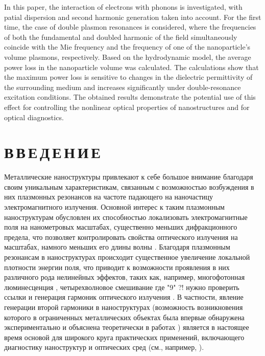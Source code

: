 \documentclass[12pt, a4paper]{article}
\newcommand{\rd}[1]{\color{red} #1 \color{black}}
\begin{document}
In this paper, the interaction of electrons with phonons is investigated, with  patial dispersion and second harmonic generation taken into account.
For the first time, the case of double plasmon resonances is considered, where the frequencies of both the fundamental and doubled harmonic of the field simultaneously coincide with the Mie frequency and the frequency of one of the nanoparticle's volume plasmons, respectively.
Based on the hydrodynamic model, the average power loss in the nanoparticle volume was calculated.
The calculations show that the maximum power loss is sensitive to changes in the dielectric permittivity of the surrounding medium and increases significantly under double-resonance excitation conditions.
The obtained results demonstrate the potential use of this effect for controlling the nonlinear optical properties of nanostructures and for optical diagnostics.\\



\newpage

\section*{В\,В\,Е\,Д\,Е\,Н\,И\,Е}

Металлические наноструктуры привлекают к себе большое внимание благодаря своим уникальным характеристикам, связанным с возможностью возбуждения в них плазмонных резонансов на частоте падающего на наночастицу электромагнитного излучения.
Основной интерес к таким плазмонным наноструктурам обусловлен их способностью локализовать электромагнитные поля на нанометровых масштабах, существенно меньших дифракционного предела, что позволяет контролировать свойства оптического излучения на масштабах, намного меньших его длины волны \cite{Mai2007, Gram2010}.
Благодаря плазмонным резонансам в наноструктурах происходит существенное увеличение локальной плотности энергии поля, что приводит к возможности проявления в них различного рода нелинейных эффектов, таких как, например, многофотонная люминесценция \cite{Cas2011,biagioni2012,chen2021, ko2011}, четырехволновое смешивание \cite{danckwerts2007, harutyunyan2012, paspalakis2014, singh2016} \rd{где "9" ?! нужно проверить ссылки} и генерация гармоник оптического излучения \cite{drobyh2020, smirnova2014, TorresTorres2010}.
В частности, явление генерации второй гармоники в наноструктурах  (возможность возникновения которого в ограниченных металлических объектах была впервые обнаружена экспериментально и объяснена теоретически в работах \cite{franken1961, Bloembergen1962}) является в настоящее время основой для широкого круга практических применений, включающего диагностику наноструктур и оптических сред (см., например, \cite{butet2015, Butet2012}).
\end{document}
